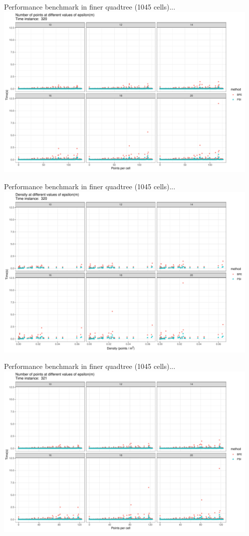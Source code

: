 \documentclass{beamer}
\begin{document}

\begin{frame}{Performance benchmark in finer quadtree (1045 cells)...}
    \centering
    \includegraphics[width=0.95\textwidth]{figures/psi_count_320}
\end{frame}

\begin{frame}{Performance benchmark in finer quadtree (1045 cells)...}
    \centering
    \includegraphics[width=0.95\textwidth]{figures/psi_density_320}
\end{frame}

\begin{frame}{Performance benchmark in finer quadtree (1045 cells)...}
    \centering
    \includegraphics[width=0.95\textwidth]{figures/psi_count_321}
\end{frame}
\end{document}
